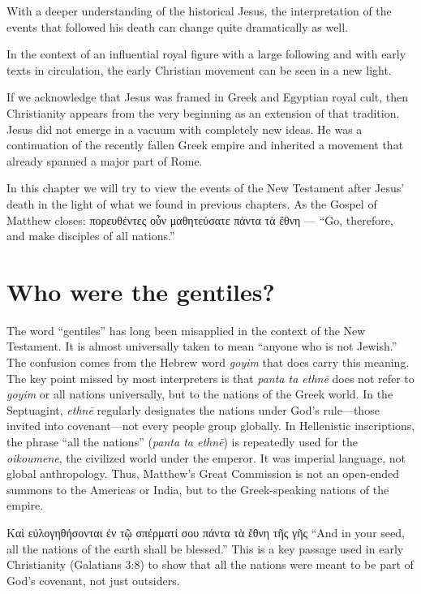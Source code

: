 With a deeper understanding of the historical Jesus, the interpretation of the events that followed his death can change quite dramatically as well.

In the context of an influential royal figure with a large following and with early texts in circulation, the early Christian movement can be seen in a new light.

If we acknowledge that Jesus was framed in Greek and Egyptian royal cult, then Christianity appears from the very beginning as an extension of that tradition.
Jesus did not emerge in a vacuum with completely new ideas.
He was a continuation of the recently fallen Greek empire and inherited a movement that already spanned a major part of Rome.

In this chapter we will try to view the events of the New Testament after Jesus’ death in the light of what we found in previous chapters.
As the Gospel of Matthew closes: πορευθέντες οὖν μαθητεύσατε πάντα τὰ ἔθνη — “Go, therefore, and make disciples of all nations.”

\section{Who were the gentiles?}\label{sec:who-were-the-gentiles}

The word “gentiles” has long been misapplied in the context of the New Testament.
It is almost universally taken to mean “anyone who is not Jewish.”
The confusion comes from the Hebrew word \textit{goyim} that does carry this meaning.
The key point missed by most interpreters is that \textit{panta ta ethnē} does not refer to \textit{goyim} or all nations universally, but to the nations of the Greek world.
In the Septuagint, \textit{ethnē} regularly designates the nations under God’s rule—those invited into covenant—not every people group globally.
In Hellenistic inscriptions, the phrase “all the nations” (\textit{panta ta ethnē}) is repeatedly used for the \textit{oikoumene}, the civilized world under the emperor.
It was imperial language, not global anthropology.
Thus, Matthew’s Great Commission is not an open-ended summons to the Americas or India, but to the Greek-speaking nations of the empire.

Καὶ εὐλογηθήσονται ἐν τῷ σπέρματί σου πάντα τὰ ἔθνη τῆς γῆς ``And in your seed, all the nations of the earth shall be blessed.''
This is a key passage used in early Christianity (Galatians 3:8) to show that all the nations were meant to be part of God's covenant, not just outsiders.


